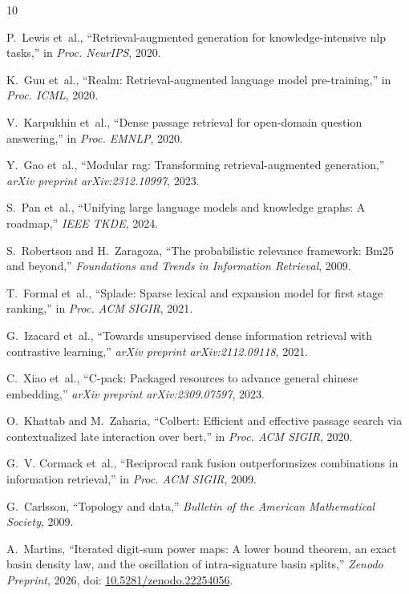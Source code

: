 \documentclass[10pt,twocolumn]{article}
\theoremstyle{definition}
\begin{document}
\begin{thebibliography}{10}

P.~Lewis et~al., ``Retrieval-augmented generation for knowledge-intensive nlp tasks,'' in \emph{Proc. NeurIPS}, 2020.

K.~Guu et~al., ``Realm: Retrieval-augmented language model pre-training,'' in \emph{Proc. ICML}, 2020.

V.~Karpukhin et~al., ``Dense passage retrieval for open-domain question answering,'' in \emph{Proc. EMNLP}, 2020.

Y.~Gao et~al., ``Modular rag: Transforming retrieval-augmented generation,'' \emph{arXiv preprint arXiv:2312.10997}, 2023.

S.~Pan et~al., ``Unifying large language models and knowledge graphs: A roadmap,'' \emph{IEEE TKDE}, 2024.

S.~Robertson and H.~Zaragoza, ``The probabilistic relevance framework: Bm25 and beyond,'' \emph{Foundations and Trends in Information Retrieval}, 2009.

T.~Formal et~al., ``Splade: Sparse lexical and expansion model for first stage ranking,'' in \emph{Proc. ACM SIGIR}, 2021.

G.~Izacard et~al., ``Towards unsupervised dense information retrieval with contrastive learning,'' \emph{arXiv preprint arXiv:2112.09118}, 2021.

C.~Xiao et~al., ``C-pack: Packaged resources to advance general chinese embedding,'' \emph{arXiv preprint arXiv:2309.07597}, 2023.

O.~Khattab and M.~Zaharia, ``Colbert: Efficient and effective passage search via contextualized late interaction over bert,'' in \emph{Proc. ACM SIGIR}, 2020.

G.~V. Cormack et~al., ``Reciprocal rank fusion outperformsizes combinations in information retrieval,'' in \emph{Proc. ACM SIGIR}, 2009.

G.~Carlsson, ``Topology and data,'' \emph{Bulletin of the American Mathematical Society}, 2009.

A.~Martins, ``Iterated digit-sum power maps: A lower bound theorem, an exact basin density law, and the oscillation of intra-signature basin splits,'' \emph{Zenodo Preprint}, 2026, doi: \href{https://doi.org/10.5281/zenodo.22254056}{10.5281/zenodo.22254056}.

\end{thebibliography}
\end{document}
